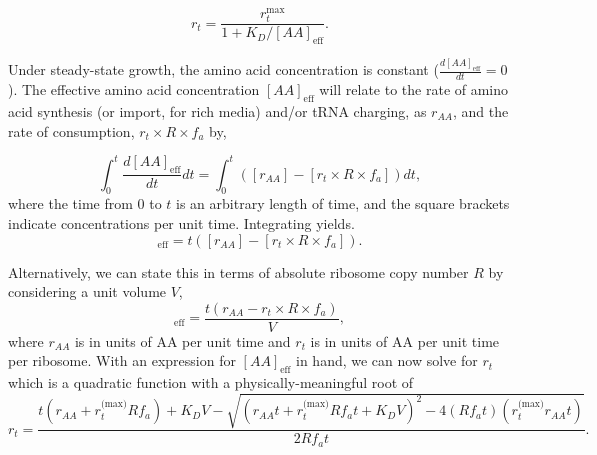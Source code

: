\begin{equation}
r_t = \frac{r_{t}^{\text{max}}}{1 + K_D/[AA]_{\text{eff}}}.
\label{eq:rt_kd_simple}
\end{equation}

Under steady-state growth, the amino acid concentration is constant
($\frac{d[AA]_\text{eff}}{dt}=0$). The effective amino acid concentration
$[AA]_{\text{eff}}$ will relate to the rate of amino acid synthesis (or import,
for rich media) and/or tRNA charging, as $r_{AA}$, and the rate of consumption,
$r_t\times R \times f_a$ by,

\begin{equation}
\int_{0}^{t} \frac{d[AA]_{\text{eff}}}{dt} dt =  \int_{0}^{t}([r_{AA}] - [r_t\times R \times f_a]) dt,
\label{eq:aaeff_int}
\end{equation}
where the time from 0 to $t$ is an arbitrary length of time, and the square
brackets indicate concentrations per unit time.
Integrating  yields.
\begin{equation}
[AA]_{\text{eff}} =  t([r_{AA}] - [r_t \times R \times f_a]).
\label{eq:aaeff_concs}
\end{equation}

Alternatively, we can state this in terms of absolute ribosome copy number $R$
by considering a unit volume $V$,
\begin{equation}
   [AA]_\text{eff} = \frac{t(r_{AA} - r_t \times R \times f_a)}{V},
   \label{eq:aa_final}
\end{equation}
where $r_{AA}$ is in units of AA per unit time and $r_t$ is in units of AA per
unit time per ribosome. With an expression for $[AA]_\text{eff}$ in hand, we can now solve
 for $r_t$ which is a quadratic function with a
physically-meaningful root of
\begin{equation}
r_t = \frac{t(r_{AA} + r_t^\text{(max)}Rf_a) + K_D V - \sqrt{(r_{AA}t + r_t^\text{(max)}Rf_at + K_D V)^2 - 4(Rf_at)(r_t^\text{(max)}r_{AA} t)}}{2Rf_at}.
\label{eq:rt_root}
\end{equation}

